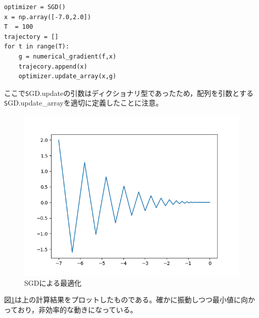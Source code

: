 \documentclass{jarticle}
\begin{document}
\begin{lstlisting}
optimizer = SGD()
x = np.array([-7.0,2.0])
T  = 100
trajectory = []
for t in range(T):
	g = numerical_gradient(f,x)
	trajecory.append(x)
	optimizer.update_array(x,g)
\end{lstlisting}
ここで{\texttt SGD.update}の引数はディクショナリ型であったため，配列を引数とする{\texttt SGD.update\_array}を適切に定義したことに注意。\\
\begin{figure}[htbp]
	\begin{center}
		\includegraphics[scale = 0.5]{test1.png}
		\caption{SGDによる最適化}
		\label{test1}
	\end{center}
\end{figure}
図\ref{test1}は上の計算結果をプロットしたものである。確かに振動しつつ最小値に向かっており，非効率的な動きになっている。
\end{document}
